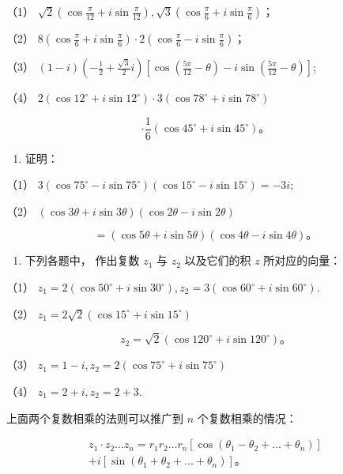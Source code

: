 （1）
\(\sqrt{2}\left(\cos \frac{\pi}{12} + i\sin \frac{\pi}{12}\right), \sqrt{3}\left(\cos \frac{\pi}{6} + i\sin \frac{\pi}{6}\right)\)；

（2）
\(8\left(\cos \frac{\pi}{6} + i\sin \frac{\pi}{6}\right) \cdot 2\left(\cos \frac{\pi}{6} - i\sin \frac{\pi}{6}\right)\)；

（3）
\((1 - i)\left(-\frac{1}{2} +\frac{\sqrt{3}}{2} i\right)\left[\cos \left(\frac{5\pi}{12} -\theta\right) - i\sin \left(\frac{5\pi}{12} -\theta\right)\right];\)

（4）
\(2(\cos 12^{\circ} + i\sin 12^{\circ}) \cdot 3(\cos 78^{\circ} + i\sin 78^{\circ})\)

\[
\cdot \frac {1}{6} (\cos 45 ^ {\circ} + i \sin 45 ^ {\circ})\text{。}
\]

\begin{enumerate}[start=2]
\item
  证明：
\end{enumerate}

（1）
\(3(\cos 75^{\circ} - i\sin 75^{\circ})(\cos 15^{\circ} - i\sin 15^{\circ}) = -3i;\)

（2） \((\cos 3\theta + i \sin 3\theta)(\cos 2\theta - i \sin 2\theta)\)

\[
= (\cos 5 \theta + i \sin 5 \theta) (\cos 4 \theta - i \sin 4 \theta)\text{。}
\]

\begin{enumerate}[start=3]
\item
  下列各题中， 作出复数 \(z_{1}\) 与 \(z_{2}\) 以及它们的积 \(z\)
  所对应的向量：
\end{enumerate}

（1）
\(z_{1} = 2(\cos 50^{\circ} + i\sin 30^{\circ}), z_{2} = 3(\cos 60^{\circ} + i\sin 60^{\circ}).\)

（2） \(z_{1} = 2\sqrt{2} (\cos 15^{\circ} + i\sin 15^{\circ})\)

\[
z _ {2} = \sqrt {2} (\cos 120 ^ {\circ} + i \sin 120 ^ {\circ})\text{。}
\]

（3） \(z_{1} = 1 - i, z_{2} = 2(\cos 75^{\circ} + i\sin 75^{\circ})\)

（4） \(z_{1} = 2 + i, z_{2} = 2 + 3.\)

上面两个复数相乘的法则可以推广到 \(n\) 个复数相乘的情况：

\[
\begin{array}{l} z _ {1} \cdot z _ {2} \dots z _ {n} = r _ {1} r _ {2} \dots r _ {n} [ \cos (\theta_ {1} - \theta_ {2} + \dots + \theta_ {n}) ] \\ + i \left[ \sin \left(\theta_ {1} + \theta_ {2} + \dots + \theta_ {n}\right) \right]\text{。} \\ \end{array}
\]

